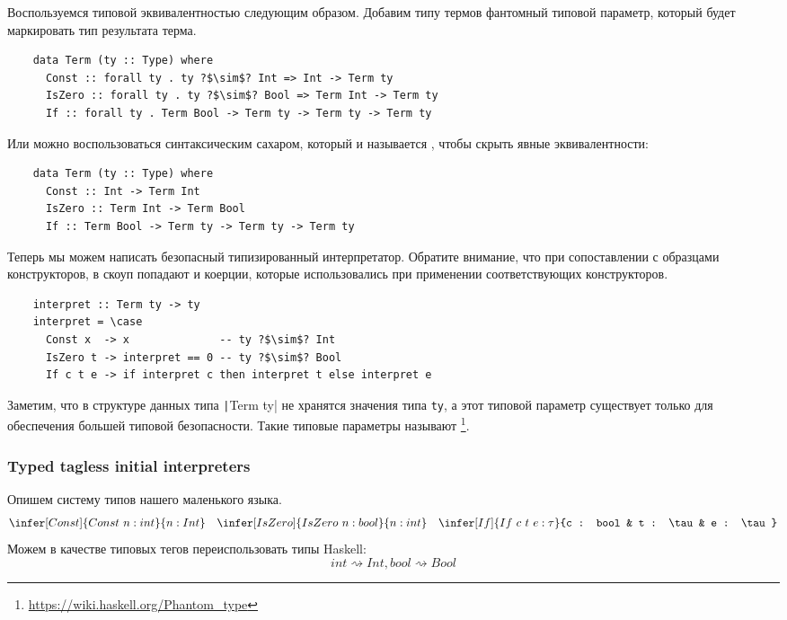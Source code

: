 Воспользуемся типовой эквивалентностью следующим образом.
Добавим типу термов фантомный типовой параметр, который будет маркировать тип результата терма.
\begin{verbatim}
    data Term (ty :: Type) where
      Const :: forall ty . ty ?$\sim$? Int => Int -> Term ty
      IsZero :: forall ty . ty ?$\sim$? Bool => Term Int -> Term ty
      If :: forall ty . Term Bool -> Term ty -> Term ty -> Term ty
\end{verbatim}
Или можно воспользоваться синтаксическим сахаром, который и называется , чтобы скрыть явные эквивалентности:
\begin{verbatim}
    data Term (ty :: Type) where
      Const :: Int -> Term Int
      IsZero :: Term Int -> Term Bool
      If :: Term Bool -> Term ty -> Term ty -> Term ty
\end{verbatim}

Теперь мы можем написать безопасный типизированный интерпретатор.
Обратите внимание, что при сопоставлении с образцами конструкторов, в скоуп попадают и коерции, которые использовались при применении соответствующих конструкторов.
\begin{verbatim}
    interpret :: Term ty -> ty
    interpret = \case
      Const x  -> x              -- ty ?$\sim$? Int
      IsZero t -> interpret == 0 -- ty ?$\sim$? Bool
      If c t e -> if interpret c then interpret t else interpret e
\end{verbatim}

Заметим, что в структуре данных типа \texttt|Term ty| не хранятся значения типа \texttt{ty}, а этот типовой параметр существует только для обеспечения большей типовой безопасности.
Такие типовые параметры называют \footnote{\url{https://wiki.haskell.org/Phantom_type}}.

\subsubsection{Typed tagless initial interpreters}

Опишем систему типов нашего маленького языка.
\begin{equation*}{}
    \infer[Const]{Const~n : int}{n : Int}
    \quad
    \infer[IsZero]{IsZero~n : bool}{n : int}
    \quad
    \infer[If]{If~c~t~e : \tau}{c : bool & t : \tau & e : \tau}
\end{equation*}
Можем в качестве типовых тегов переиспользовать типы Haskell: \[int \rightsquigarrow Int, bool \rightsquigarrow Bool\]

